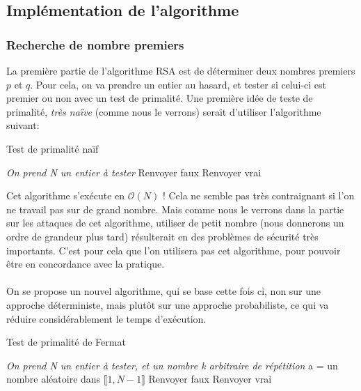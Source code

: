 \documentclass[12 pt]{article}
\begin{document}
\subsection{Implémentation de l'algorithme}
\subsubsection{Recherche de nombre premiers}

La première partie de l'algorithme RSA est de déterminer deux nombres premiers $p$ et $q$. Pour cela, on va prendre un entier au hasard, et tester si celui-ci est premier ou non avec un test de primalité. Une première idée de teste de primalité, \textit{très naïve} (comme nous le verrons) serait d'utiliser l'algorithme suivant:

\begin{algorithm}
	\caption{Test de primalité naïf}
	\label{primalite-naif}
	\begin{algorithmic}[1]
		\State \textit{On prend N un entier à tester}
		\State Renvoyer faux
		\EndIf
		\EndFor
		\State Renvoyer vrai
	\end{algorithmic}
\end{algorithm}

Cet algorithme s'exécute en $\mathcal{O}(N)$ ! Cela ne semble pas très contraignant si l'on ne travail pas sur de grand nombre. Mais comme nous le verrons dans la partie sur les attaques de cet algorithme, utiliser de petit nombre (nous donnerons un ordre de grandeur plus tard) résulterait en des problèmes de sécurité très importants. C'est pour cela que l'on utilisera pas cet algorithme, pour pouvoir être en concordance avec la pratique.
\\\\
On se propose un nouvel algorithme, qui se base cette fois ci, non sur une approche déterministe, mais plutôt sur une approche probabiliste, ce qui va réduire considérablement le temps d'exécution.

\begin{algorithm}
	\caption{Test de primalité de Fermat}
	\label{primalite-fermat}
	\begin{algorithmic}[1]
		\State \textit{On prend N un entier à tester, et un nombre k arbitraire de répétition}
		\State a = un nombre aléatoire dans $\llbracket 1, N-1 \rrbracket$
		\State Renvoyer faux
		\EndIf
		\EndFor
		\State Renvoyer vrai
	\end{algorithmic}
\end{algorithm}
\end{document}
